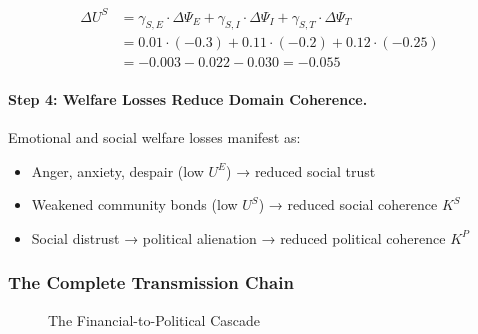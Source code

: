 \begin{align}
\Delta U^S &= \gamma_{S,E} \cdot \Delta \Psi_E + \gamma_{S,I} \cdot \Delta \Psi_I + \gamma_{S,T} \cdot \Delta \Psi_T \\
&= 0.01 \cdot (-0.3) + 0.11 \cdot (-0.2) + 0.12 \cdot (-0.25) \\
&= -0.003 - 0.022 - 0.030 = -0.055
\end{align}

\paragraph{Step 4: Welfare Losses Reduce Domain Coherence.}
Emotional and social welfare losses manifest as:
\begin{itemize}
    \item Anger, anxiety, despair (low $U^E$) → reduced social trust
    \item Weakened community bonds (low $U^S$) → reduced social coherence $K^S$
    \item Social distrust → political alienation → reduced political coherence $K^P$
\end{itemize}

\subsubsection{The Complete Transmission Chain}

\begin{figure}[htbp]
\centering
\caption{The Financial-to-Political Cascade}
\label{fig:cascade}
\begin{center}
\end{center}
\end{figure}

